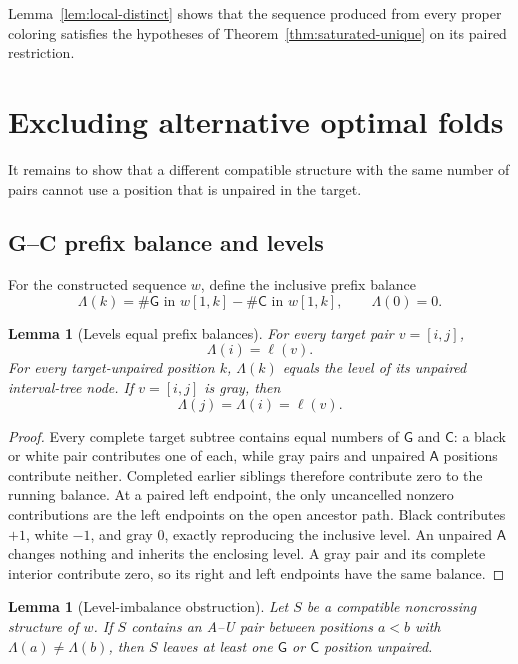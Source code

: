 \documentclass[11pt]{article}
\newtheorem{lemma}[theorem]{Lemma}
\newcommand{\A}{\textsf{A}}
\newcommand{\C}{\textsf{C}}
\newcommand{\G}{\textsf{G}}
\newcommand{\level}{\ell}
\begin{document}
Lemma~\ref{lem:local-distinct} shows that the sequence produced from every proper coloring satisfies the hypotheses of Theorem~\ref{thm:saturated-unique} on its paired restriction.

\section{Excluding alternative optimal folds}
\label{sec:notie}

It remains to show that a different compatible structure with the same number of pairs cannot use a position that is unpaired in the target.

\subsection{G--C prefix balance and levels}

For the constructed sequence $w$, define the inclusive prefix balance
\[
\Lambda(k)=\#\G\text{ in }w[1,k]-\#\C\text{ in }w[1,k],
\qquad \Lambda(0)=0.
\]

\begin{lemma}[Levels equal prefix balances]
\label{lem:level-balance}
For every target pair $v=[i,j]$,
\[
\Lambda(i)=\level(v).
\]
For every target-unpaired position $k$, $\Lambda(k)$ equals the level of its unpaired interval-tree node.  If $v=[i,j]$ is gray, then
\[
\Lambda(j)=\Lambda(i)=\level(v).
\]
\end{lemma}

\begin{proof}
Every complete target subtree contains equal numbers of $\G$ and $\C$: a black or white pair contributes one of each, while gray pairs and unpaired $\A$ positions contribute neither.  Completed earlier siblings therefore contribute zero to the running balance.  At a paired left endpoint, the only uncancelled nonzero contributions are the left endpoints on the open ancestor path.  Black contributes $+1$, white $-1$, and gray $0$, exactly reproducing the inclusive level.  An unpaired $\A$ changes nothing and inherits the enclosing level.  A gray pair and its complete interior contribute zero, so its right and left endpoints have the same balance.
\end{proof}

\begin{lemma}[Level-imbalance obstruction]
\label{lem:imbalance}
Let $S$ be a compatible noncrossing structure of $w$.  If $S$ contains an A--U pair between positions $a<b$ with $\Lambda(a)\ne\Lambda(b)$, then $S$ leaves at least one $\G$ or $\C$ position unpaired.
\end{lemma}
\end{document}
